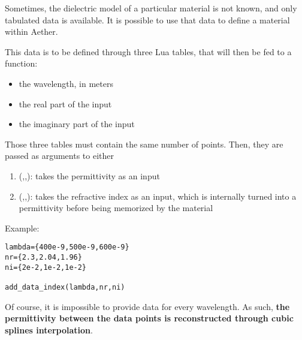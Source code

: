 Sometimes, the dielectric model of a particular material is not known, and only tabulated data is available. It is possible to use that data to define a material within Aether.

This data is to be defined through three Lua tables, that will then be fed to a function:
\begin{itemize}
	\item the wavelength, in meters
	\item the real part of the input
	\item the imaginary part of the input
\end{itemize}
Those three tables must contain the same number of points. Then, they are passed as arguments to either
\begin{enumerate}
	\item {}(,,): takes the permittivity as an input
	\item {}(,,): takes the refractive index as an input, which is internally turned into a permittivity  before being memorized by the material
\end{enumerate}
Example:
\begin{lstlisting}
lambda={400e-9,500e-9,600e-9}
nr={2.3,2.04,1.96}
ni={2e-2,1e-2,1e-2}

add_data_index(lambda,nr,ni)
\end{lstlisting}

Of course, it is impossible to provide data for every wavelength. As such, \textbf{the permittivity between the data points is reconstructed through cubic splines interpolation}.